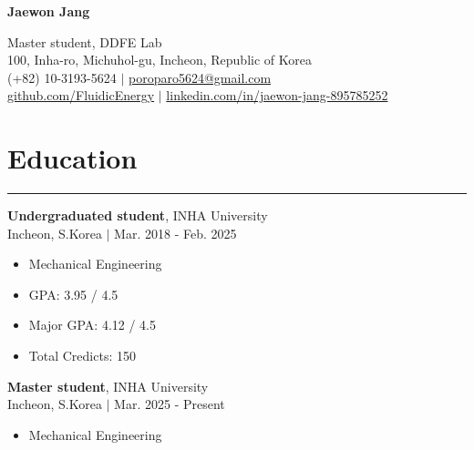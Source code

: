 \documentclass{article} %
\newcommand{\mycventry}[5]{
  \vspace{1.5em} %

  \textbf{#1}, #2 \\ %
  #3 $|$ #4 \\[0.4em] %

  \begin{itemize}[nosep, after=\vspace{-0.4em}] %
    #5 %
  \end{itemize}
}
\newcommand{\sectionsplitrule}{
  \hrule %
  \vspace{1em} %
}
\begin{document}
\begin{center}
    {\Huge \textbf{Jaewon Jang}} %

    \vspace{0.5em} %

    Master student, DDFE Lab \\ %
    100, Inha-ro, Michuhol-gu, Incheon, Republic of Korea \\ %
    (+82) 10-3193-5624 $|$ \href{mailto:poroparo5624@gmail.com}{poroparo5624@gmail.com} \\ %
    \href{https://github.com/FluidicEnergy}{github.com/FluidicEnergy} $|$ \href{https://www.linkedin.com/in/jaewon-jang-895785252}{linkedin.com/in/jaewon-jang-895785252} %
\end{center}




\section*{Education}
\sectionsplitrule

\mycventry
  {Undergraduated student} %
  {INHA University} %
  {Incheon, S.Korea} %
  {Mar. 2018 - Feb. 2025} %
  { %
    \item Mechanical Engineering 
    \item GPA: 3.95 / 4.5
    \item Major GPA: 4.12 / 4.5
    \item Total Credicts: 150 
  }

\mycventry
  {Master student}
  {INHA University} %
  {Incheon, S.Korea} %
  {Mar. 2025 - Present} %
  {
    \item Mechanical Engineering 
  }


\end{document}

